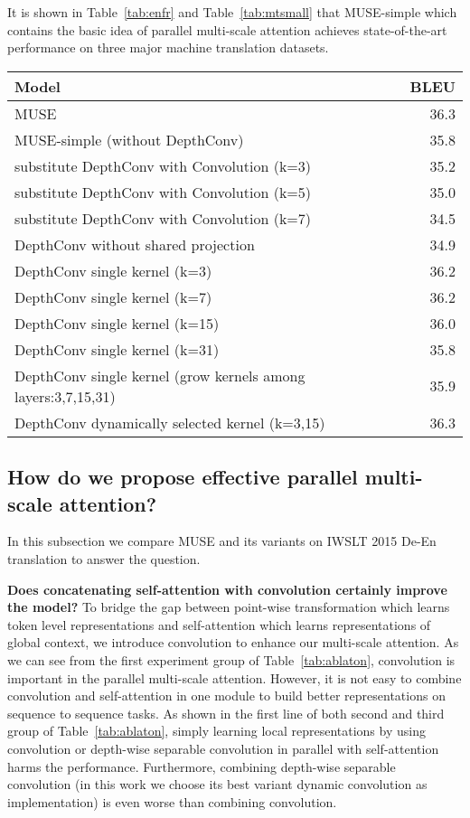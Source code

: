 \documentclass{article} \usepackage{iclr2020_conference,times}
\begin{document}
It is shown in Table~\ref{tab:enfr} and Table~\ref{tab:mtsmall} that MUSE-simple which contains the  basic idea of parallel multi-scale attention achieves state-of-the-art performance on three major machine translation datasets.









\begin{table*}[t]
\centering
\begin{tabular}{lr}
\toprule
Model & BLEU \\
\midrule
MUSE & 36.3\\
MUSE-simple (without DepthConv) & 35.8 \\ \midrule
substitute DepthConv with Convolution (k=3) & 35.2 \\  
substitute DepthConv with Convolution (k=5) & 35.0 \\  
substitute DepthConv with Convolution (k=7) & 34.5 \\  \midrule
DepthConv without shared projection &34.9 \\
DepthConv single kernel (k=3) & 36.2 \\  
DepthConv single kernel (k=7) & 36.2 \\ 
DepthConv single kernel (k=15) & 36.0 \\  
DepthConv single kernel (k=31) & 35.8 \\
DepthConv single kernel (grow kernels among layers:3,7,15,31) & 35.9 \\
DepthConv dynamically selected kernel (k=3,15) & 36.3 \\
\bottomrule
\end{tabular}
\caption{Comparisons between  MUSE and its variants on the IWSLT 2015 De-En translation task.}
\label{tab:ablaton}
\end{table*}
\subsection{How do we propose effective parallel multi-scale attention?}
In this subsection we compare MUSE and its variants on  IWSLT 2015 De-En translation  to answer the question.
 
\textbf{Does concatenating self-attention with convolution certainly improve the model?}
To bridge the gap between point-wise transformation which learns token level representations and self-attention which learns representations of global context, we introduce convolution to enhance our multi-scale attention. As we can see from the  first experiment group of Table~\ref{tab:ablaton},   convolution is important in the parallel multi-scale attention. 
However, it is not easy to combine convolution and self-attention in one module to build better representations on sequence to sequence tasks. As  shown in the first line of both second and third group of Table~\ref{tab:ablaton}, simply learning local representations by using convolution or depth-wise separable convolution in parallel with self-attention  harms the performance. Furthermore, combining depth-wise separable convolution (in this work we choose its best variant dynamic convolution as implementation) is even worse than  combining convolution.
\end{document}
